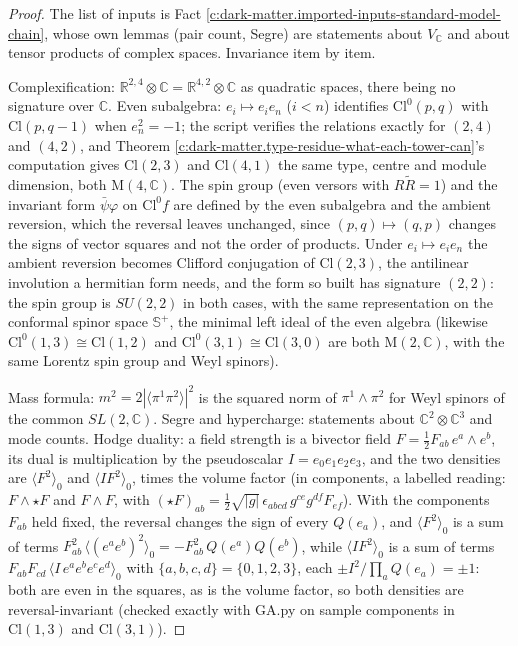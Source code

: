 \documentclass[11pt]{article}
\theoremstyle{definition}
\theoremstyle{plain}
\providecommand{\C}{}\renewcommand{\C}{\mathbb{C}}
\providecommand{\CS}{}\renewcommand{\CS}{{\mathbb{S}^{+}}}
\providecommand{\Cl}{}\renewcommand{\Cl}{\mathrm{Cl}}
\providecommand{\Mat}{}\renewcommand{\Mat}{\mathrm{M}}
\providecommand{\R}{}\renewcommand{\R}{\mathbb{R}}
\providecommand{\br}{}\renewcommand{\br}[1]{\langle #1\rangle}
\begin{document}
\begin{proof}
The list of inputs is Fact \ref{c:dark-matter.imported-inputs-standard-model-chain}, whose own lemmas (pair count, Segre) are statements about $V_{\C}$ and about tensor products of complex spaces. Invariance item by item.

Complexification: $\R^{2,4} \otimes \C = \R^{4,2} \otimes \C$ as quadratic spaces, there being no signature over $\C$. Even subalgebra: $e_{i} \mapsto e_{i}e_{n}$ ($i < n$) identifies $\Cl^{0}(p,q)$ with $\Cl(p, q-1)$ when $e_{n}^{2} = -1$; the script verifies the relations exactly for $(2,4)$ and $(4,2)$, and Theorem \ref{c:dark-matter.type-residue-what-each-tower-can}'s computation gives $\Cl(2,3)$ and $\Cl(4,1)$ the same type, centre and module dimension, both $\Mat(4,\C)$. The spin group (even versors with $R\tilde{R} = 1$) and the invariant form $\bar{\psi}\varphi$ on $\Cl^{0}f$ are defined by the even subalgebra and the ambient reversion, which the reversal leaves unchanged, since $(p,q) \mapsto (q,p)$ changes the signs of vector squares and not the order of products. Under $e_{i} \mapsto e_{i}e_{n}$ the ambient reversion becomes Clifford conjugation of $\Cl(2,3)$, the antilinear involution a hermitian form needs, and the form so built has signature $(2,2)$: the spin group is $SU(2,2)$ in both cases, with the same representation on the conformal spinor space $\CS$, the minimal left ideal of the even algebra (likewise $\Cl^{0}(1,3) \cong \Cl(1,2)$ and $\Cl^{0}(3,1) \cong \Cl(3,0)$ are both $\Mat(2,\C)$, with the same Lorentz spin group and Weyl spinors).

Mass formula: $m^{2} = 2|\br{\pi^{1}\pi^{2}}|^{2}$ is the squared norm of $\pi^{1} \wedge \pi^{2}$ for Weyl spinors of the common $SL(2,\C)$. Segre and hypercharge: statements about $\C^{2} \otimes \C^{3}$ and mode counts. Hodge duality: a field strength is a bivector field $F = \tfrac12 F_{ab}\,e^{a}\wedge e^{b}$, its dual is multiplication by the pseudoscalar $I = e_{0}e_{1}e_{2}e_{3}$, and the two densities are $\langle F^{2}\rangle_{0}$ and $\langle IF^{2}\rangle_{0}$, times the volume factor (in components, a labelled reading: $F \wedge \star F$ and $F \wedge F$, with $(\star F)_{ab} = \tfrac{1}{2}\sqrt{|g|}\,\epsilon_{abcd}\,g^{ce}g^{df}F_{ef}$). With the components $F_{ab}$ held fixed, the reversal changes the sign of every $Q(e_{a})$, and $\langle F^{2}\rangle_{0}$ is a sum of terms $F_{ab}^{2}\,\langle(e^{a}e^{b})^{2}\rangle_{0} = -F_{ab}^{2}\,Q(e^{a})Q(e^{b})$, while $\langle IF^{2}\rangle_{0}$ is a sum of terms $F_{ab}F_{cd}\,\langle I\,e^{a}e^{b}e^{c}e^{d}\rangle_{0}$ with $\{a,b,c,d\} = \{0,1,2,3\}$, each $\pm I^{2}/\prod_{a}Q(e_{a}) = \pm 1$: both are even in the squares, as is the volume factor, so both densities are reversal-invariant (checked exactly with GA.py on sample components in $\Cl(1,3)$ and $\Cl(3,1)$).


\end{proof}
\end{document}
